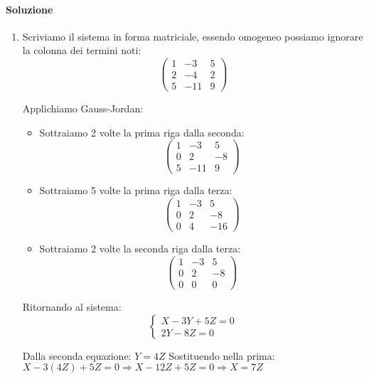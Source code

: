 \documentclass{article}
\theoremstyle{plain}
\theoremstyle{definition}
\theoremstyle{remark}
\begin{document}
\paragraph{Soluzione}
\begin{enumerate}
    \item Scriviamo il sistema in forma matriciale, essendo omogeneo possiamo ignorare la colonna dei termini noti:
    \[
    \begin{pmatrix}
    1 & -3 & 5 \\
    2 & -4 & 2 \\
    5 & -11 & 9 
    \end{pmatrix}
    \]
    
    Applichiamo Gauss-Jordan:
    \begin{itemize}
        \item Sottraiamo 2 volte la prima riga dalla seconda:
        \[
        \begin{pmatrix}
        1 & -3 & 5 \\
        0 & 2 & -8 \\
        5 & -11 & 9 
        \end{pmatrix}
        \]
        
        \item Sottraiamo 5 volte la prima riga dalla terza:
        \[
        \begin{pmatrix}
        1 & -3 & 5 \\
        0 & 2 & -8 \\
        0 & 4 & -16 
        \end{pmatrix}
        \]
        
        \item Sottraiamo 2 volte la seconda riga dalla terza:
        \[
        \begin{pmatrix}
        1 & -3 & 5 \\
        0 & 2 & -8 \\
        0 & 0 & 0 
        \end{pmatrix}
        \]
    \end{itemize}
    
    Ritornando al sistema:
    \[\begin{cases}
    X - 3Y + 5Z = 0 \\
    2Y - 8Z = 0
    \end{cases}\]
    
    Dalla seconda equazione: $Y = 4Z$
    Sostituendo nella prima: $X - 3(4Z) + 5Z = 0 \Rightarrow X - 12Z + 5Z = 0 \Rightarrow X = 7Z$
    

\end{enumerate}
\end{document}
